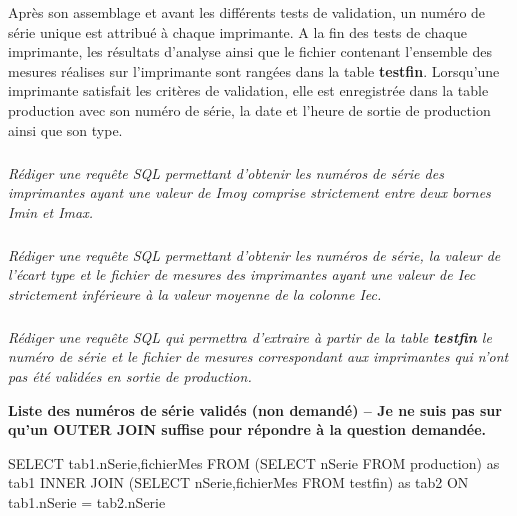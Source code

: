 \documentclass[10pt]{article}
\newif\ifprof
\begin{document}
Après son assemblage et avant les différents tests de validation, un numéro de série unique est
attribué à chaque imprimante. A la fin des tests de chaque imprimante, les résultats d'analyse
ainsi que le fichier contenant l'ensemble des mesures réalises sur l'imprimante sont rangées dans
la table \textbf{testfin}. Lorsqu'une imprimante satisfait les critères de validation, elle est enregistrée dans la table production avec son numéro de série, la date et l'heure de sortie de production ainsi que son type.



\subparagraph{}
\textit{Rédiger une requête SQL permettant d'obtenir les numéros de série des imprimantes ayant
une valeur de Imoy comprise strictement entre deux bornes Imin et Imax.}
\ifprof
\begin{corrige}
\begin{sql}
SELECT nSerie FROM testfin WHERE Imoy>Imin and  Imoy < Imax ;
\end{sql}
\end{corrige}

\else
\fi



\subparagraph{}
\textit{Rédiger une requête SQL permettant d'obtenir les numéros de série, la valeur de l'écart
type et le fichier de mesures des imprimantes ayant une valeur de Iec strictement inférieure à
la valeur moyenne de la colonne Iec.}
\ifprof
\begin{corrige}
\begin{sql}
SELECT nSerie,Iec,fichierMes FROM testfin WHERE Iec < (SELECT AVG(Iec) FROM testfin);
\end{sql}
\end{corrige}

\else
\fi


\subparagraph{}
\textit{Rédiger une requête SQL qui permettra d'extraire à partir de la table \textbf{testfin} le numéro
de série et le fichier de mesures correspondant aux imprimantes qui n'ont pas été validées en
sortie de production.}
\ifprof
\begin{corrige}
\textbf{Liste des numéros de série validés (non demandé) -- Je ne suis pas sur qu'un OUTER JOIN  suffise pour répondre à la question demandée.}
\begin{sql}
SELECT tab1.nSerie,fichierMes FROM 
	(SELECT nSerie FROM production) as tab1
	INNER JOIN 
	(SELECT nSerie,fichierMes FROM  testfin) as tab2
	ON tab1.nSerie = tab2.nSerie

\end{sql}
\end{corrige}
\end{document}
